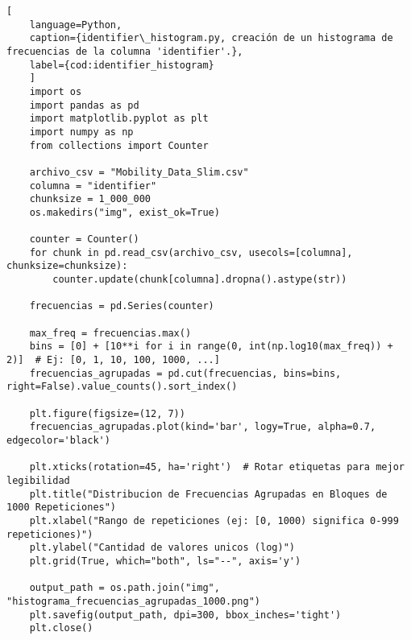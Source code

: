 \begin{lstlisting}[
    language=Python,
    caption={identifier\_histogram.py, creación de un histograma de frecuencias de la columna 'identifier'.},
    label={cod:identifier_histogram}
    ]
    import os
    import pandas as pd
    import matplotlib.pyplot as plt
    import numpy as np
    from collections import Counter

    archivo_csv = "Mobility_Data_Slim.csv"
    columna = "identifier"  
    chunksize = 1_000_000  
    os.makedirs("img", exist_ok=True) 

    counter = Counter()
    for chunk in pd.read_csv(archivo_csv, usecols=[columna], chunksize=chunksize):
        counter.update(chunk[columna].dropna().astype(str))

    frecuencias = pd.Series(counter)

    max_freq = frecuencias.max()
    bins = [0] + [10**i for i in range(0, int(np.log10(max_freq)) + 2)]  # Ej: [0, 1, 10, 100, 1000, ...]
    frecuencias_agrupadas = pd.cut(frecuencias, bins=bins, right=False).value_counts().sort_index()

    plt.figure(figsize=(12, 7))
    frecuencias_agrupadas.plot(kind='bar', logy=True, alpha=0.7, edgecolor='black')

    plt.xticks(rotation=45, ha='right')  # Rotar etiquetas para mejor legibilidad
    plt.title("Distribucion de Frecuencias Agrupadas en Bloques de 1000 Repeticiones")
    plt.xlabel("Rango de repeticiones (ej: [0, 1000) significa 0-999 repeticiones)")
    plt.ylabel("Cantidad de valores unicos (log)")
    plt.grid(True, which="both", ls="--", axis='y')

    output_path = os.path.join("img", "histograma_frecuencias_agrupadas_1000.png")
    plt.savefig(output_path, dpi=300, bbox_inches='tight')
    plt.close()
\end{lstlisting}
\vfill

